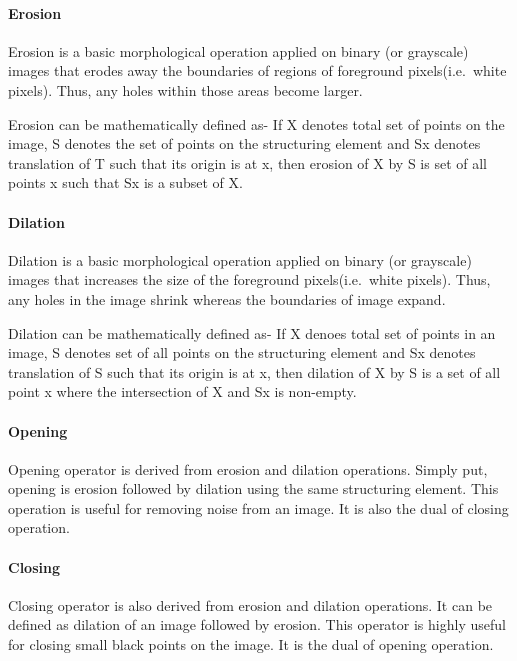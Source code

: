 \documentclass[]{article}
\let\oldparagraph\paragraph
\renewcommand{\paragraph}[1]{\oldparagraph{#1}\mbox{}}
\begin{document}
\paragraph{Erosion}\label{erosion}

Erosion is a basic morphological operation applied on binary (or
grayscale) images that erodes away the boundaries of regions of
foreground pixels(i.e.~white pixels). Thus, any holes within those areas
become larger.

Erosion can be mathematically defined as- If X denotes total set of
points on the image, S denotes the set of points on the structuring
element and Sx denotes translation of T such that its origin is at x,
then erosion of X by S is set of all points x such that Sx is a subset
of X.

\paragraph{Dilation}\label{dilation}

Dilation is a basic morphological operation applied on binary (or
grayscale) images that increases the size of the foreground
pixels(i.e.~white pixels). Thus, any holes in the image shrink whereas
the boundaries of image expand.

Dilation can be mathematically defined as- If X denoes total set of
points in an image, S denotes set of all points on the structuring
element and Sx denotes translation of S such that its origin is at x,
then dilation of X by S is a set of all point x where the intersection
of X and Sx is non-empty.

\paragraph{Opening}\label{opening}

Opening operator is derived from erosion and dilation operations. Simply
put, opening is erosion followed by dilation using the same structuring
element. This operation is useful for removing noise from an image. It
is also the dual of closing operation.

\paragraph{Closing}\label{closing}

Closing operator is also derived from erosion and dilation operations.
It can be defined as dilation of an image followed by erosion. This
operator is highly useful for closing small black points on the image.
It is the dual of opening operation.
\end{document}
